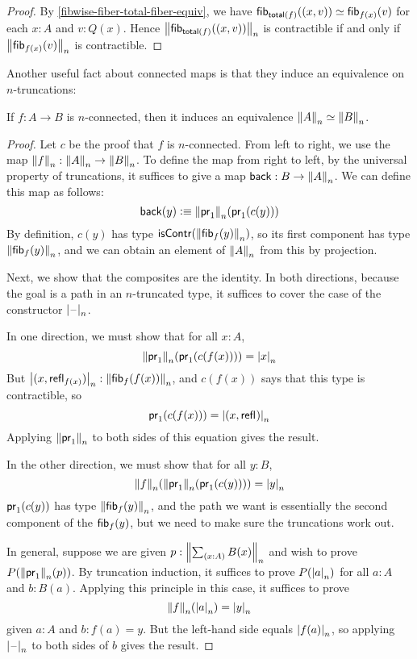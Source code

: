 \begin{proof}
By \cref{fibwise-fiber-total-fiber-equiv}, we have
$\hfib{\total f}{\pairr{x,v}}\eqvsym\hfib{f(x)}v$
for each $x:A$ and $v:Q(x)$. Hence $\trunc n{\hfib{\total f}{\pairr{x,v}}}$ is contractible if and only if
$\trunc n{\hfib{f(x)}v}$ is contractible.
\end{proof}

Another useful fact about connected maps is that they induce an
equivalence on $n$-truncations:

\begin{lem} \label{lem:connected-map-equiv-truncation}
If $f : A \to B$ is $n$-connected, then it induces an equivalence
$\eqv{\trunc{n}{A}}{\trunc{n}{B}}$.
\end{lem}
\begin{proof}
Let $c$ be the proof that $f$ is $n$-connected.  From left to right, we
use the map $\trunc{n}{f} : \trunc{n}{A} \to \trunc{n}{B}$.
To define the map from right to left, by the universal property of
truncations, it suffices to give a map $\mathsf{back} : B \to {\trunc{n}{A}}$.  We can
define this map as follows:
\[
\mathsf{back}(y) \defeq \trunc{n}{\proj{1}}{(\proj{1}{(c(y))})}
\]
By definition, $c(y)$ has type $\iscontr(\trunc n {\hfiber{f}y})$, so its
first component has type $\trunc n{\hfiber{f}y}$, and we can obtain an
element of $\trunc n A$ from this by projection.

Next, we show that the composites are the identity.  In both directions,
because the goal is a path in an $n$-truncated type, it suffices to
cover the case of the constructor $\tprojf{n}$.

In one direction, we must show that for all $x:A$,
\[
\trunc{n}{\proj{1}}{(\proj{1}{(c(f(x)))})} = \tproj{n}{x}
\]
But $\tproj{n}{(x, \refl{f(x)})} : \trunc n{\hfiber{f}{f(x)}}$, and
$c(f(x))$ says that this type is contractible, so
\[
\proj{1}{(c(f(x)))} = \tproj{n}{(x, \refl{})}
\]
Applying $\trunc{n}{\proj{1}}$ to both sides of this equation gives the
result.

In the other direction, we must show that for all $y:B$,
\[
\trunc{n}{f}(\trunc{n}{\proj{1}} (\proj{1}{(c(y))})) = \tproj{n}{y}
\]
$\proj{1}{(c(y))}$ has type $\trunc n {\hfiber{f}y}$, and the path we
want is essentially the second component of the $\hfiber{f}y$, but we
need to make sure the truncations work out.

In general, suppose we are given $p:\trunc{n}{\sm{x:A} B(x)}$ and wish to prove
$P(\trunc{n}{\proj{1}{}}(p))$. By truncation induction, it suffices to
prove $P(\tproj{n}{a})$ for all $a:A$ and $b:B(a)$.  Applying this
principle in this case, it suffices to prove
\[
\trunc{n}{f}(\tproj{n}{a}) = \tproj{n}{y}
\]
given $a:A$ and $b:f (a) = y$.  But the left-hand side equals $\tproj{n}{f (a)}$,
so applying $\tprojf{n}$ to both sides of $b$ gives the result.
\end{proof}

